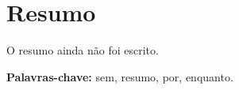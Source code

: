 \chapter*{Resumo}

O resumo ainda não foi escrito. %

\vspace{1em}

\noindent \textbf{Palavras-chave:} sem, resumo, por, enquanto.
